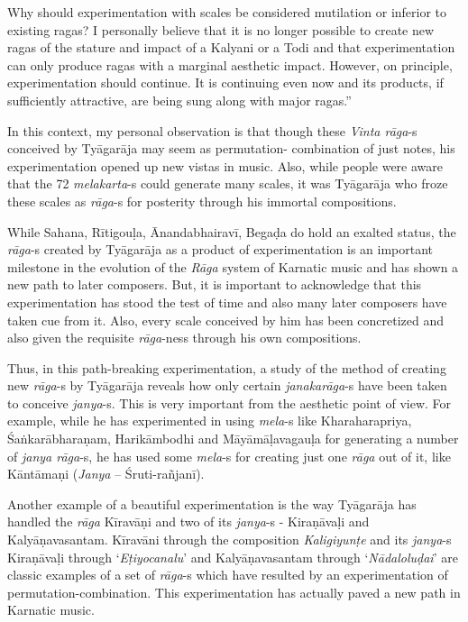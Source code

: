 \begin{myquote}
Why should experimentation with scales be considered mutilation or inferior to existing ragas? I personally believe that it is no longer possible to create new ragas of the stature and impact of a Kalyani or a Todi and that experimentation can only produce ragas with a marginal aesthetic impact. However, on principle, experimentation should continue. It is continuing even now and its products, if sufficiently attractive, are being sung along with major ragas.”
\end{myquote}

In this context, my personal observation is that though these \textit{Vinta rāga}-s conceived by Tyāgarāja may seem as permutation- combination of just notes, his experimentation opened up new vistas in music. Also, while people were aware that the 72 \textit{melakarta}-s could generate many scales, it was Tyāgarāja who froze these scales as \textit{rāga}-s for posterity through his immortal compositions.

While Sahana, Rītigouḷa, Ānandabhairavī, Begaḍa do hold an exalted status, the \textit{rāga}-s created by Tyāgarāja as a product of experimentation is an important milestone in the evolution of the \textit{Rāga} system of Karnatic music and has shown a new path to later composers. But, it is important to acknowledge that this experimentation has stood the test of time and also many later composers have taken cue from it. Also, every scale conceived by him has been concretized and also given the requisite \textit{rāga}-ness through his own compositions.

Thus, in this path-breaking experimentation, a study of the method of creating new \textit{rāga}-s by Tyāgarāja reveals how only certain \textit{janaka\break rāga}-s have been taken to conceive \textit{janya}-s. This is very important from the aesthetic point of view. For example, while he has experimented in using \textit{mela}-s like Kharaharapriya, Śaṅkarābharaṇam, Harikāmbodhi and Māyāmāḷavagauḷa for generating a number of \textit{janya rāga}-s, he has used some \textit{mela}-s for creating just one \textit{rāga} out of it, like Kāntāmaṇi (\textit{Janya} – Śruti-rañjanī).

Another example of a beautiful experimentation is the way Tyāgarāja has handled the \textit{rāga} Kīravāṇi and two of its \textit{janya}-s - Kiraṇāvaḷi and Kalyāṇavasantam. Kīravāni through the composition \textit{Kaligiyunṭe} and its \textit{janya}-s Kiraṇāvaḷi through ‘\textit{Eṭiyocanalu}’ and Kalyāṇavasantam through ‘\textit{Nādaloluḍai}’ are classic examples of a set of \textit{rāga}-s which have resulted by an experimentation of permutation-combination. This experimentation has actually paved a new path in Karnatic music.

